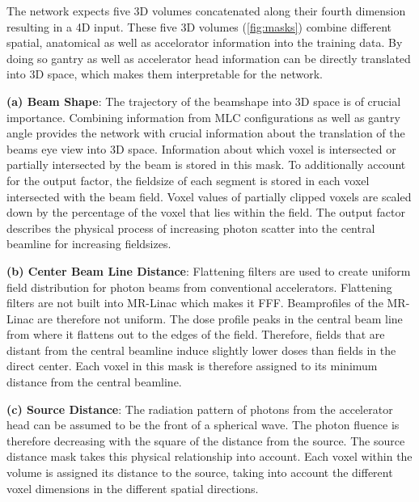 The network expects five 3D volumes concatenated along their fourth dimension resulting in a 4D input. 
These five 3D volumes (\autoref{fig:masks}) combine different spatial, anatomical as well as accelorator information into the training data. 
By doing so gantry as well as accelerator head information can be directly translated into 3D space, which makes them interpretable for the network. 

\setlength{\hangingindent}{1em}

\begin{hangingpar}
    \item \textbf{(a) Beam Shape}: The trajectory of the beamshape into 3D space is of crucial importance. 
    Combining information from \acs{MLC} configurations as well as gantry angle provides the network with crucial information about the translation of the beams eye view into 3D space. 
    Information about which voxel is intersected or partially intersected by the beam is stored in this mask. 
    To additionally account for the output factor, the fieldsize of each segment is stored in each voxel intersected with the beam field. 
    Voxel values of partially clipped voxels are scaled down by the percentage of the voxel that lies within the field. 
    The output factor describes the physical process of increasing photon scatter into the central beamline for increasing fieldsizes. 
    
\end{hangingpar}

\begin{hangingpar}
    \item \textbf{(b) Center Beam Line Distance}: 
    Flattening filters are used to create uniform field distribution for photon beams from conventional accelerators.
    Flattening filters are not built into MR-Linac which makes it \ac{FFF}. 
    Beamprofiles of the MR-Linac are therefore not uniform.
    The dose profile peaks in the central beam line from where it flattens out to the edges of the field.
    Therefore, fields that are distant from the central beamline induce slightly lower doses than fields in the direct center.
    Each voxel in this mask is therefore assigned to its minimum distance from the central beamline. 
\end{hangingpar}

\begin{hangingpar}
    \item \textbf{(c) Source Distance}: 
    The radiation pattern of photons from the accelerator head can be assumed to be the front of a spherical wave. 
    The photon fluence is therefore decreasing with the square of the distance from the source. 
    The source distance mask takes this physical relationship into account. 
    Each voxel within the volume is assigned its distance to the source, taking into account the different voxel dimensions in the different spatial directions. 
    
\end{hangingpar}

